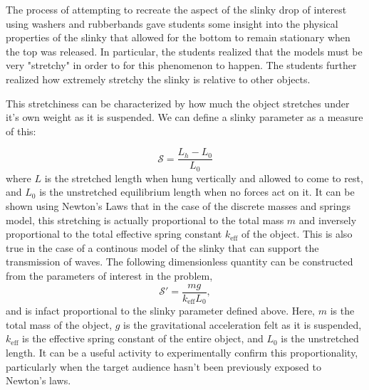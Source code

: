 \documentclass[prb,preprint]{revtex4-1}
\newcommand{\FIGstudents}{
\begin{figure}[t]\center
\texttt{[image: FIGstudents.pdf]}
\caption{\label{fig:students} Students from the 2012 Compass Project summer program with model slinkies built out of washers and rubberbands.}
\end{figure}
}
\begin{document}

The process of attempting to recreate the aspect of the slinky drop of interest using washers and rubberbands  
gave students some insight into the physical properties of the slinky that allowed for the bottom to  remain 
stationary when the top was released.  In particular, the students realized that the models must be very "stretchy"
in order to for this phenomenon to happen.  The students further realized how extremely stretchy the slinky is 
relative to other objects.

This stretchiness can be characterized by how much the object stretches
under it's own weight as it is suspended.   We can define a slinky parameter as a measure of this:

\begin{equation}
\mathcal{S}=\frac{L_h-L_0}{L_0}
\end{equation}
where $L$ is the stretched length when hung vertically and allowed to come to rest, and $L_0$ is the unstretched equilibrium length
when no forces act on it.  It can be shown using Newton's Laws that in the case of the discrete masses and springs model,
this stretching is actually proportional to the total mass $m$ and inversely proportional to the total effective spring constant $k_{\text{eff}}$ of the object.
This is also true in the case of a continous model of the slinky that can support the transmission of waves.  The following dimensionless quantity
can be constructed from the parameters of interest in the problem,
\begin{equation}
\mathcal{S'}=\frac{m g}{k_\text{eff} L_0 },
\end{equation}
 and is infact proportional to the  slinky parameter defined above.  Here, $m$ is the total mass of the object, $g$ is the gravitational acceleration felt as it is suspended, $k_\text{eff}$ is the effective spring constant of the entire object, and $L_0$ is the unstretched length.  It can be a useful activity to experimentally 
confirm this proportionality, particularly when the target audience hasn't been previously exposed to Newton's laws.
\end{document}
